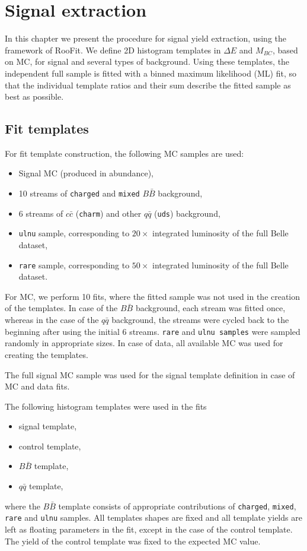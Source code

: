 \documentclass[oneside,a4paper,openany,12pt]{scrbook}
\begin{document}
\chapter{Signal extraction}
In this chapter we present the procedure for signal yield extraction, using the framework of RooFit. We define 2D histogram templates in $\Delta E$ and $M_{BC}$, based on MC, for signal and several types of background. Using these templates, the independent full sample is fitted with a binned maximum likelihood (ML) fit, so that the individual template ratios and their sum describe the fitted sample as best as possible.



\section{Fit templates}

For fit template construction, the following MC samples are used:
\begin{itemize}
\item Signal MC (produced in abundance),
\item 10 streams of \texttt{charged} and \texttt{mixed} $B \bar B$ background,
\item 6 streams of $c \bar c$ (\texttt{charm}) and other $q \bar q$ (\texttt{uds}) background,
\item \texttt{ulnu} sample, corresponding to $20\times$ integrated luminosity of the full Belle dataset,
\item \texttt{rare} sample, corresponding to $50\times$ integrated luminosity of the full Belle dataset.
\end{itemize}

For MC, we perform 10 fits, where the fitted sample was not used in the creation of the templates. In case of the $B\bar B$ background, each stream was fitted once, whereas in the case of the $q\bar q$ background, the streams were cycled back to the beginning after using the initial 6 streams. \texttt{rare} and \texttt{ulnu samples} were sampled randomly in appropriate sizes. In case of data, all available MC was used for creating the templates.

The full signal MC sample was used for the signal template definition in case of MC and data fits.

The following histogram templates were used in the fits
\begin{itemize}
\item signal template,
\item control template,
\item $B \bar B$ template,
\item $q \bar q$ template,
\end{itemize}
where the $B \bar B$ template consists of appropriate contributions of \texttt{charged}, \texttt{mixed}, \texttt{rare} and \texttt{ulnu} samples. All templates shapes are fixed and all template yields are left as floating parameters in the fit, except in the case of the control template. The yield of the control template was fixed to the expected MC value.
\end{document}
